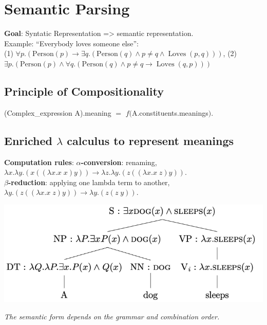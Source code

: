 \section{Semantic Parsing}

\textbf{Goal}: Syntatic Representation => semantic representation. \\ Example: “Everybody loves someone else”: \\ (1) $ \forall p .(\mathrm{Person}(p) \rightarrow \exists q .(\mathrm{Person}(q) \wedge p \neq q \wedge \operatorname{Loves}(p, q)))$, \quad (2) $ \exists p .(\mathrm{Person}(p) \wedge \forall q .(\mathrm{Person}(q) \wedge p \neq q \rightarrow \operatorname{Loves}(q, p)))$

\subsection*{Principle of Compositionality}
(Complex\_expression A).meaning $=$ $f($A.constituents.meanings$)$.

\subsection*{Enriched $\lambda$ calculus to represent meanings}
\textbf{Computation rules}: $\alpha$\textbf{-conversion}: renaming, \\
$\lambda x . \lambda y .(x((\lambda x . x \; x) y)) \rightarrow \lambda z . \lambda y .(z((\lambda x . x \; z) y))$. \\
$\beta$\textbf{-reduction}: applying one lambda term to another, $\lambda y .(z((\lambda x. x \; z) y)) \rightarrow \lambda y.(z(z \;y))$.
\vspace{-0.4cm}
\begin{center}
    \includegraphics[width=\columnwidth]{img/semantic_representation.png}
\end{center}
\vspace{-0.5cm}
\textit{The semantic form depends on the grammar and combination order.}

